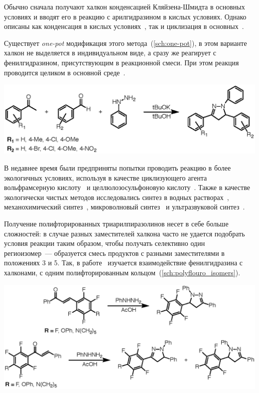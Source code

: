 Обычно сначала получают халкон конденсацией Кляйзена-Шмидта в основных условиях и вводят его в реакцию с арилгидразином в кислых условиях.
Однако описаны как конденсация в кислых условиях~\cite{Wang2010, Nielsen}, так и циклизация в основных~\cite{Munawar2008, Neudorfer2014, Manyem2007, Patel2004, Singh2014}.

Существует \emph{one-pot} модификация этого метода~(\ref{sch:one-pot}), в этом варианте халкон не выделяется в индивидуальном виде, а сразу же реагирует с фенилгидразином, присутствующим в реакционной смеси.
При этом реакция проводится целиком в основной среде~\cite{Farooq2020}.

\begin{scheme}
    \centering
    \includegraphics{sections/literature/img/one-pot.eps}
    \caption{}
    \label{sch:one-pot}
\end{scheme}

В недавнее время были предприняты попытки проводить реакцию в более экологичных условиях, используя в качестве циклизующего агента вольфрамсерную кислоту~\cite{Rahmatzadeh2015} и целлюлозосульфоновую кислоту~\cite{Daneshfar2015}.
Также в качестве экологически чистых методов исследовались синтез в водных растворах~\cite{Markovic2015}, механохимический синтез~\cite{Zangade2013}, микроволновый синтез~\cite{Adhikari2012} и ультразвуковой синтез~\cite{Shelke2012}. 

Получение полифторированных триарилпиразолинов несет в себе больше сложностей: в случае разных заместителей халкона часто не удается подобрать условия реакции таким образом, чтобы получать селективно один региоизомер~--- образуется смесь продуктов с разными заместителями в положениях 3 и 5.
Так, в работе~\cite{2010} изучается взаимодействие фенилгидразина с халконами, с одним полифторированным кольцом~(\ref{sch:polyflouro_isomers}).

\begin{scheme}
    \centering
    \includegraphics{sections/literature/img/polyflouro_isomers.eps}
    \caption{}
    \label{sch:polyflouro_isomers}
\end{scheme}

